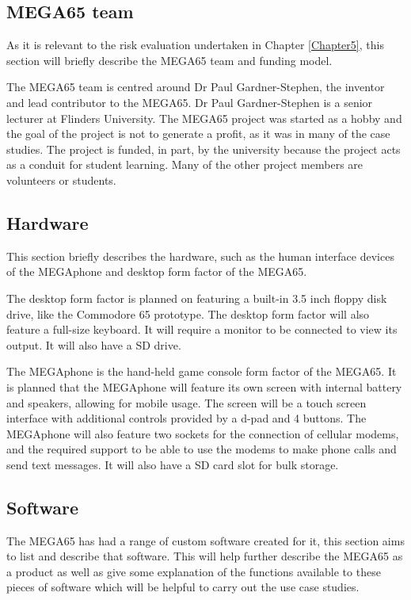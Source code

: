 \subsection{MEGA65 team}
As it is relevant to the risk evaluation undertaken in Chapter \ref{Chapter5}, this section will briefly describe the MEGA65 team and funding model. 

The MEGA65 team is centred around Dr Paul Gardner-Stephen, the inventor and lead contributor to the MEGA65. Dr Paul Gardner-Stephen is a senior lecturer at Flinders University. The MEGA65 project was started as a hobby and the goal of the project is not to generate a profit, as it was in many of the case studies. The project is funded, in part, by the university because the project acts as a conduit for student learning. Many of the other project members are volunteers or students.

\subsection{Hardware}
This section briefly describes the hardware, such as the human interface devices of the MEGAphone and desktop form factor of the MEGA65. 

The desktop form factor is planned on featuring a built-in 3.5 inch floppy disk drive, like the Commodore 65 prototype. The desktop form factor will also feature a full-size keyboard. It will require a monitor to be connected to view its output. It will also have a SD drive.

The MEGAphone is the hand-held game console form factor of the MEGA65. It is planned that the MEGAphone will feature its own screen with internal battery and speakers, allowing for mobile usage. The screen will be a touch screen interface with additional controls provided by a d-pad and 4 buttons. The MEGAphone will also feature two sockets for the connection of cellular modems, and the required support to be able to use the modems to make phone calls and send text messages. It will also have a SD card slot for bulk storage.  

\subsection{Software}
\label{Software}
The MEGA65 has had a range of custom software created for it, this section aims to list and describe that software. This will help further describe the MEGA65 as a product as well as give some explanation of the functions available to these pieces of software which will be helpful to carry out the use case studies.\\

